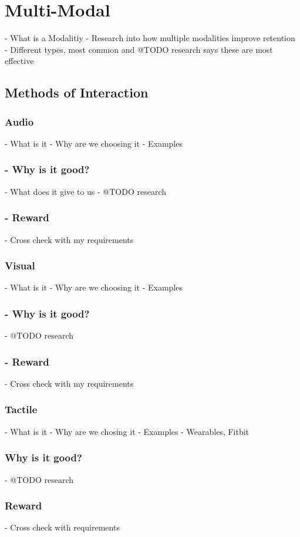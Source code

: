 \newpage

\section{Multi-Modal}
  - What is a Modalitiy
  - Research into how multiple modalities improve retention
  - Different types, most common and @TODO research says these are most effective
  \subsection{Methods of Interaction}
  \subsubsection*{Audio}
      - What is it
      - Why are we choosing it
      - Examples
      \subsubsection*{- Why is it good?}
        - What does it give to us
        - @TODO research
      \subsubsection*{- Reward}
        - Cross check with my requirements
  \subsubsection*{Visual}
      - What is it
      - Why are we choosing it
      - Examples
      \subsubsection*{- Why is it good?}
        - @TODO research
      \subsubsection*{- Reward}
        - Cross check with my requirements
  \subsubsection*{Tactile}
      - What is it
      - Why are we chosing it
      - Examples
      - Wearables, Fitbit
    \subsubsection*{Why is it good?}
        - @TODO research
    \subsubsection*{Reward}
        - Cross check with requirements

